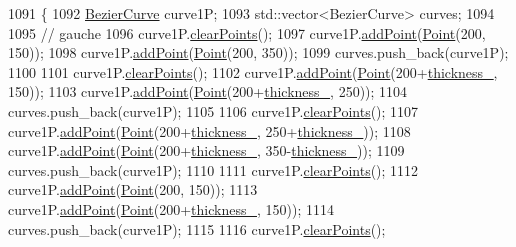 \begin{DoxyCode}
1091               \{
1092     \mbox{\hyperlink{class_bezier_curve}{BezierCurve}} curve1P;
1093     std::vector<BezierCurve> curves;
1094 
1095     \textcolor{comment}{// gauche}
1096     curve1P.\mbox{\hyperlink{class_bezier_curve_a0ba8ce66d5af5971ae6a1b506029728e}{clearPoints}}();
1097     curve1P.\mbox{\hyperlink{class_bezier_curve_a38d16c18b36ae45619b05e26e226cf34}{addPoint}}(\mbox{\hyperlink{class_point}{Point}}(200, 150));
1098     curve1P.\mbox{\hyperlink{class_bezier_curve_a38d16c18b36ae45619b05e26e226cf34}{addPoint}}(\mbox{\hyperlink{class_point}{Point}}(200, 350));
1099     curves.push\_back(curve1P);
1100 
1101     curve1P.\mbox{\hyperlink{class_bezier_curve_a0ba8ce66d5af5971ae6a1b506029728e}{clearPoints}}();
1102     curve1P.\mbox{\hyperlink{class_bezier_curve_a38d16c18b36ae45619b05e26e226cf34}{addPoint}}(\mbox{\hyperlink{class_point}{Point}}(200+\mbox{\hyperlink{class_font_v1_aed8040e76be9a52833627b92f0fb4e5f}{thickness\_}}, 150));
1103     curve1P.\mbox{\hyperlink{class_bezier_curve_a38d16c18b36ae45619b05e26e226cf34}{addPoint}}(\mbox{\hyperlink{class_point}{Point}}(200+\mbox{\hyperlink{class_font_v1_aed8040e76be9a52833627b92f0fb4e5f}{thickness\_}}, 250));
1104     curves.push\_back(curve1P);
1105 
1106     curve1P.\mbox{\hyperlink{class_bezier_curve_a0ba8ce66d5af5971ae6a1b506029728e}{clearPoints}}();
1107     curve1P.\mbox{\hyperlink{class_bezier_curve_a38d16c18b36ae45619b05e26e226cf34}{addPoint}}(\mbox{\hyperlink{class_point}{Point}}(200+\mbox{\hyperlink{class_font_v1_aed8040e76be9a52833627b92f0fb4e5f}{thickness\_}}, 250+\mbox{\hyperlink{class_font_v1_aed8040e76be9a52833627b92f0fb4e5f}{thickness\_}}));
1108     curve1P.\mbox{\hyperlink{class_bezier_curve_a38d16c18b36ae45619b05e26e226cf34}{addPoint}}(\mbox{\hyperlink{class_point}{Point}}(200+\mbox{\hyperlink{class_font_v1_aed8040e76be9a52833627b92f0fb4e5f}{thickness\_}}, 350-\mbox{\hyperlink{class_font_v1_aed8040e76be9a52833627b92f0fb4e5f}{thickness\_}}));
1109     curves.push\_back(curve1P);
1110 
1111     curve1P.\mbox{\hyperlink{class_bezier_curve_a0ba8ce66d5af5971ae6a1b506029728e}{clearPoints}}();
1112     curve1P.\mbox{\hyperlink{class_bezier_curve_a38d16c18b36ae45619b05e26e226cf34}{addPoint}}(\mbox{\hyperlink{class_point}{Point}}(200, 150));
1113     curve1P.\mbox{\hyperlink{class_bezier_curve_a38d16c18b36ae45619b05e26e226cf34}{addPoint}}(\mbox{\hyperlink{class_point}{Point}}(200+\mbox{\hyperlink{class_font_v1_aed8040e76be9a52833627b92f0fb4e5f}{thickness\_}}, 150));
1114     curves.push\_back(curve1P);
1115 
1116     curve1P.\mbox{\hyperlink{class_bezier_curve_a0ba8ce66d5af5971ae6a1b506029728e}{clearPoints}}();

\end{DoxyCode}
